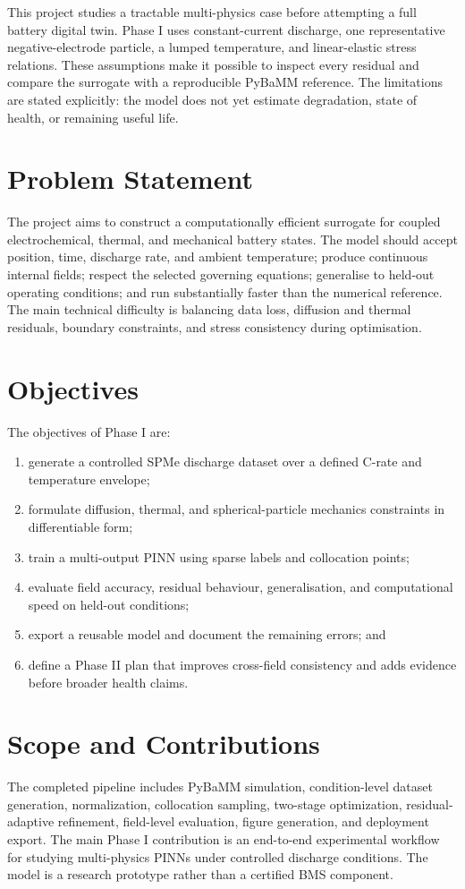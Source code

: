 \documentclass[14pt,a4paper,oneside]{extreport}
\begin{document}
This project studies a tractable multi-physics case before attempting a full battery digital twin. Phase I uses constant-current discharge, one representative negative-electrode particle, a lumped temperature, and linear-elastic stress relations. These assumptions make it possible to inspect every residual and compare the surrogate with a reproducible PyBaMM reference. The limitations are stated explicitly: the model does not yet estimate degradation, state of health, or remaining useful life.

\section{Problem Statement}
The project aims to construct a computationally efficient surrogate for coupled electrochemical, thermal, and mechanical battery states. The model should accept position, time, discharge rate, and ambient temperature; produce continuous internal fields; respect the selected governing equations; generalise to held-out operating conditions; and run substantially faster than the numerical reference. The main technical difficulty is balancing data loss, diffusion and thermal residuals, boundary constraints, and stress consistency during optimisation.

\section{Objectives}
The objectives of Phase I are:
\begin{enumerate}
\item generate a controlled SPMe discharge dataset over a defined C-rate and temperature envelope;
\item formulate diffusion, thermal, and spherical-particle mechanics constraints in differentiable form;
\item train a multi-output PINN using sparse labels and collocation points;
\item evaluate field accuracy, residual behaviour, generalisation, and computational speed on held-out conditions;
\item export a reusable model and document the remaining errors; and
\item define a Phase II plan that improves cross-field consistency and adds evidence before broader health claims.
\end{enumerate}

\section{Scope and Contributions}
The completed pipeline includes PyBaMM simulation, condition-level dataset generation, normalization, collocation sampling, two-stage optimization, residual-adaptive refinement, field-level evaluation, figure generation, and deployment export. The main Phase I contribution is an end-to-end experimental workflow for studying multi-physics PINNs under controlled discharge conditions. The model is a research prototype rather than a certified BMS component.
\end{document}
